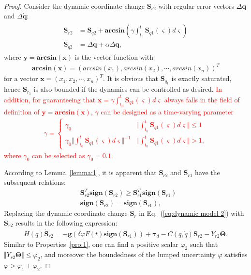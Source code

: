 \documentclass[3p]{elsarticle}
\theoremstyle{plain}
\theoremstyle{remark}
\begin{document}
\begin{proof}
Consider the dynamic coordinate change $\bm S_{r2}$ with regular error vectors $\Delta \bm q$ and $\Delta\dot{\bm q}$:
\begin{align}
\begin{split}
\bm S_{r2} &= \bm S_{q2}+\bm{arcsin}(\gamma\int^t_{t_0}\bm S_{q1}(\varsigma) d\varsigma)\\
\bm S_{q2} &= \Delta \dot {\bm q}+\alpha \Delta \bm q,
\end{split}
\end{align}
where $\bm y=\bm{arcsin}(\bm x)$ is the vector function with
\begin{align}
\bm{arcsin}(\bm x) = \left(arcsin(x_1),arcsin(x_2),\cdots,arcsin(x_n)\right)^T
\end{align}
for a vector $\bm x=\left(x_1,x_2,\cdots,x_n\right)^T$. It is obvious that $\bm S_{q_1}$ is exactly saturated, hence $\bm S_{r_1}$ is also bounded if the dynamics can be controlled as desired. \textcolor{red}{In addition, for guaranteeing that $\bm x=\gamma\int^t_{t_0}\bm S_{q1}(\varsigma) d\varsigma$ always falls in the field of definition of $\bm y=\bm{arcsin}(\bm x)$, $\gamma$ can be designed as a time-varying parameter
    \begin{align}
    \gamma=\begin{cases}
    \gamma_0&\Vert\int^t_{t_0}\bm S_{q1}(\varsigma) d\varsigma\Vert\le 1\\
    \gamma_0\Vert\int^t_{t_0}\bm S_{q1}(\varsigma) d\varsigma\Vert^{-1}&\Vert\int^t_{t_0}\bm S_{q1}(\varsigma) d\varsigma\Vert> 1,
    \end{cases}
    \end{align}
    where $\gamma_0$ can be selected as $\gamma_0=0.1$.}\par
According to Lemma~\ref{lemma:1}, it is apparent that $\bm S_{r2}$ and $\bm S_{r1}$ have the subsequent relations:
\begin{align}
&\bm S_{r2}^T \bm{sign}(\bm S_{r2}) \ge  \bm S_{r1}^T \bm{sign}(\bm S_{r1})\\
&\bm{sign}(\bm S_{r2})=\bm{sign}(\bm S_{r1}),
\end{align}
Replacing the dynamic coordinate change $\bm S_r$ in Eq.~(\ref{eq:dynamic model 2}) with $\bm S_{r2}$ results in the following expression:
\begin{align}
H(q)\dot {\bm S}_{r2} = -\bm{g}(\delta\varphi F(t) \bm{sign}(\bm S_{r1}))+\bm\tau_d-C(q,\dot q)\bm S_{r2}-Y_{r2}\bm\Theta.
\end{align}
Similar to Properties~\ref{pro:1}, one can find a positive scalar $\varphi_2$ such that $\Vert Y_{r2}\bm\Theta\Vert\le\varphi_2$, and moreover the boundedness of the lumped uncertainty $\varphi$ satisfies $\varphi>\varphi_1+\varphi_2$.


\end{proof}
\end{document}
